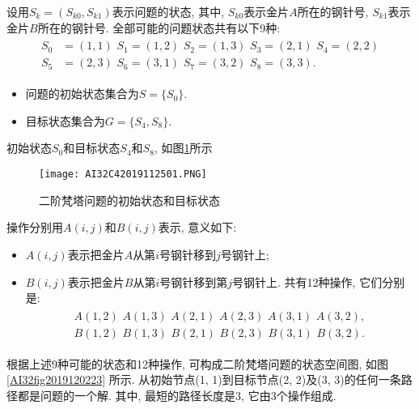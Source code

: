 \begin{result}
设用$S_k=(S_{k0}, S_{k1})$表示问题的状态, 其中, $S_{k0}$表示金片$A$所在的钢针号, $S_{k1}$表示金片$B$所在的钢针号.
全部可能的问题状态共有以下9种:
\begin{align}
\begin{array}{ll}
S_0&=(1, 1)\,\,   S_1=(1, 2)\,\,     S_2=(1, 3)\,\,    S_3=(2, 1)\,\,    S_4=(2, 2)\\
S_5&=(2, 3)\,\,   S_6=(3, 1) \,\,    S_7=(3, 2) \,\,   S_8=(3, 3).
\end{array}
\end{align}

\begin{itemize}
\item 问题的初始状态集合为$S=\{S_0\}$.
\item 目标状态集合为$G=\{S_4, S_8\}$.
\end{itemize}
初始状态$S_0$和目标状态$S_4$和$S_8$, 如图\ref{AI32fig2019120222}所示
\begin{figure}[H]
    \centering
    \texttt{[image: AI32C42019112501.PNG]}
    \caption{二阶梵塔问题的初始状态和目标状态}
    \label{AI32fig2019120222}
\end{figure}
操作分别用$A(i, j)$和$B(i, j)$表示, 意义如下:
\begin{itemize}
\item  $A(i, j)$表示把金片$A$从第$i$号钢针移到$j$号钢针上;
\item  $B(i, j)$表示把金片$B$从第$i$号钢针移到第$j$号钢针上. 共有12种操作, 它们分别是:
\begin{align}
\begin{array}{ll}
      A(1, 2)\,\,   A(1, 3) \,\,    A(2, 1)\,\,     A(2, 3) \,\,    A(3, 1) \,\,    A(3, 2),\\
      B(1, 2)\,\,     B(1, 3) \,\,     B(2, 1)\,\,     B(2, 3)  \,\,   B(3, 1)  \,\,    B(3, 2).
\end{array}
\end{align}
\end{itemize}
根据上述9种可能的状态和12种操作, 可构成二阶梵塔问题的状态空间图, 如图 \ref{AI32fig2019120223} 所示.
从初始节点(1, 1)到目标节点(2, 2)及(3, 3)的任何一条路径都是问题的一个解. 其中, 最短的路径长度是3, 它由3个操作组成.
\end{result}

